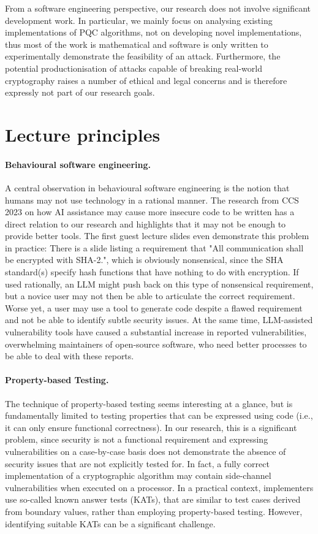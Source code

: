 \documentclass{article}
\begin{document}
From a software engineering perspective, our research does not involve significant development work. In particular, we mainly focus on analysing existing implementations of PQC algorithms, not on developing novel implementations, thus most of the work is mathematical and software is only written to experimentally demonstrate the feasibility of an attack. Furthermore, the potential productionisation of attacks capable of breaking real-world cryptography raises a number of ethical and legal concerns and is therefore expressly not part of our research goals.

\section{Lecture principles}

\paragraph{Behavioural software engineering.} A central observation in behavioural software engineering is the notion that humans may not use technology in a rational manner. The research from CCS 2023 on how AI assistance may cause more insecure code to be written has a direct relation to our research and highlights that it may not be enough to provide better tools. The first guest lecture slides even demonstrate this problem in practice: There is a slide listing a requirement that "All communication shall be encrypted with SHA-2.", which is obviously nonsensical, since the SHA standard(s) specify hash functions that have nothing to do with encryption. If used rationally, an LLM might push back on this type of nonsensical requirement, but a novice user may not then be able to articulate the correct requirement. Worse yet, a user may use a tool to generate code despite a flawed requirement and not be able to identify subtle security issues. At the same time, LLM-assisted vulnerability tools have caused a substantial increase in reported vulnerabilities, overwhelming maintainers of open-source software, who need better processes to be able to deal with these reports.

\paragraph{Property-based Testing.} The technique of property-based testing seems interesting at a glance, but is fundamentally limited to testing properties that can be expressed using code (i.e., it can only ensure functional correctness). In our research, this is a significant problem, since security is not a functional requirement and expressing vulnerabilities on a case-by-case basis does not demonstrate the absence of security issues that are not explicitly tested for. In fact, a fully correct implementation of a cryptographic algorithm may contain side-channel vulnerabilities when executed on a processor. In a practical context, implementers use so-called known answer tests (KATs), that are similar to test cases derived from boundary values, rather than employing property-based testing. However, identifying suitable KATs can be a significant challenge.
\end{document}
